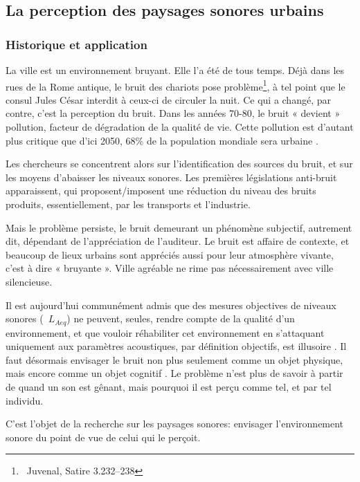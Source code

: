 \subsection{La perception des paysages sonores urbains}

\subsubsection{Historique et application}
\label{sec:ch3_urbanNoiseSoundscape}

La ville est un environnement bruyant. Elle l'a été de tous temps. Déjà dans les rues de la Rome antique, le bruit des chariots pose problème\footnote{\cf~Juvenal, Satire 3.232–238}, à tel point que le consul Jules César interdit à ceux-ci de circuler la nuit. Ce qui a changé, par contre, c'est la perception du bruit. Dans les années 70-80, le bruit « devient » pollution, facteur de dégradation de la qualité de vie. Cette pollution est d'autant plus critique que d'ici 2050, 68\% de la population mondiale sera urbaine \citep{park14}.

Les chercheurs se concentrent alors sur l'identification des sources du bruit, et sur les moyens d'abaisser les niveaux sonores. Les premières législations anti-bruit apparaissent, qui proposent/imposent une réduction du niveau des bruits produits, essentiellement, par les transports et l'industrie.

Mais le problème persiste, le bruit demeurant un phénomène subjectif, autrement dit, dépendant de l'appréciation de l'auditeur. Le bruit est affaire de contexte, et beaucoup de lieux urbains sont appréciés aussi pour leur atmosphère vivante, c'est à dire « bruyante ». Ville agréable ne rime pas nécessairement avec ville silencieuse.

Il est aujourd'hui communément admis que des mesures objectives de niveaux sonores (\eg~$L_{Aeq}$) ne peuvent, seules, rendre compte de la qualité d'un environnement, et que vouloir réhabiliter cet environnement en s'attaquant uniquement aux paramètres acoustiques, par définition objectifs, est illusoire \citep{yang2005acoustic,schulte2006soundscape,kang2010semantic,aletta2016soundscape}. Il faut désormais envisager le bruit non plus seulement comme un objet physique, mais encore comme un objet cognitif \citep{guastavino_etude_2003}. Le problème n'est plus de savoir à partir de quand un son est gênant, mais pourquoi il est perçu comme tel, et par tel individu.

C'est l'objet de la recherche sur les paysages sonores: envisager l'environnement sonore du point de vue de celui qui le perçoit.

